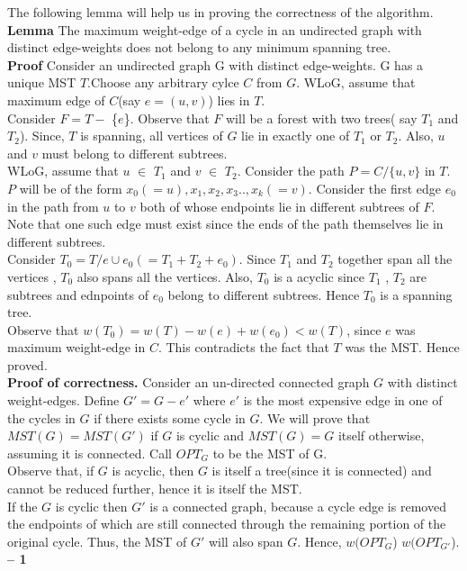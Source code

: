 \documentclass[a4paper]{article}
\begin{document}
The following lemma will help us in proving the correctness of the algorithm. \\
\linebreak
\textbf{Lemma} The maximum weight-edge of a cycle in an undirected graph with distinct edge-weights does not belong to any minimum spanning tree. \\
\linebreak
\textbf{Proof} Consider an undirected graph G with distinct edge-weights. G has a unique MST $T$.Choose any arbitrary cylce $C$ from $G$. WLoG, assume that maximum edge of $C$(say $e = (u,v)$) lies in $T$. \\
Consider $F = T -$ \{$e$\}. Observe that $F$ will be a forest with two trees( say $T_{1}$ and $T_{2}$).  Since, $T$ is spanning, all vertices of $G$ lie in exactly one of $T_{1}$ or $T_{2}$. Also, $u$ and $v$ must belong to different subtrees. \\WLoG, assume that $u$ $\in$  $T_{1}$ and $v$ $\in$ $T_{2}$. Consider the path $P = C/\{u,v\}$ in $T$. $P$ will be of the form $x_{0}(=u),x_{1},x_{2},x_{3}..,x_{k}(=v)$.  Consider the first edge $e_{0}$ in the path from $u$ to $v$ both of whose endpoints lie in different subtrees of $F$. Note that one such edge must exist since the ends of the path themselves lie in different subtrees. 
\\Consider $T_{0}= T/{e} \cup {e_0} ( = T_{1} + T_{2}+ e_{0})$. Since $T_{1}$ and $T_{2}$ together span all the vertices , $T_{0}$ also spans all the vertices. Also,   $T_{0}$ is a acyclic since $T_{1}$ , $T_{2}$ are subtrees and ednpoints of $e_{0}$  belong to different subtrees. Hence $T_{0}$ is a spanning tree. \\
Observe that $w(T_{0}) = w(T) - w(e) + w(e_{0}) < w(T)$, since $e$ was maximum weight-edge in $C$. This contradicts the fact that $T$ was the MST. Hence proved. \\
\linebreak
\textbf{Proof of correctness.} 
Consider an un-directed connected graph $G$ with distinct weight-edges. Define $G' = G - {e'}$ where $e'$ is the most expensive edge in one of the cycles in $G$ if there exists some cycle in $G$. We will prove that $MST(G) = MST(G')$ if $G$ is cyclic and $MST(G) = G$ itself otherwise, assuming it is connected. Call $OPT_{G}$ to be the MST of G.\\
Observe that, if $G$ is acyclic, then $G$ is itself a tree(since it is connected) and cannot be reduced further, hence it is itself the MST. \\
If the $G$ is cyclic then $G'$ is a connected graph, because a cycle edge is removed the endpoints of which are still connected through the remaining portion of the original cycle. Thus, the MST of $G'$ will also span $G$. Hence, $w(OPT_{G}$) \leq $w(OPT_{G'}$). \textbf{-- 1}\\
\end{document}
